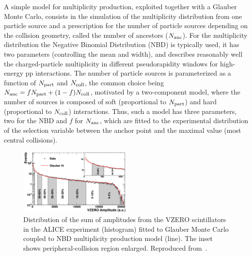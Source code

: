 A simple model for multiplicity production, exploited together with a Glauber Monte Carlo, consists in the simulation of the multiplicity distribution from one particle source and a prescription for the number of particle sources depending on the collision geometry, called the number of ancestors ($N_{\rm anc}$). For the multiplicity distribution the Negative Binomial Distribution (NBD) is typically used, it has two parameters (controlling the mean and width), and describes reasonably well the charged-particle multiplicity in different pseudorapidity windows for high-energy pp interactions. The number of particle sources is parameterized as a function of $N_{\rm part}$ and $N_{\rm coll}$, the common choice being $N_{\rm anc} = f N_{\rm part} + (1 - f) N_{\rm coll}$, motivated by a two-component model, where the number of sources is composed of soft (proportional to $N_{\rm part}$) and hard (proportional to $N_{\rm coll}$) interactions. Thus, such a model has three parameters, two for the NBD and $f$ for $N_{\rm anc}$, which are fitted to the experimental distribution of the selection variable between the anchor point and the maximal value (most central collisions).

\begin{figure}
\centering
\includegraphics[width=0.5\textwidth]{ksfigures/VZEROCent.pdf}
\caption{Distribution of the sum of amplitudes from the VZERO scintillators in the ALICE experiment (histogram) fitted to Glauber Monte Carlo coupled to NBD multiplicity production model (line). The inset shows peripheral-collision region enlarged. Reproduced from~\cite{Abelev:2013qoq}.}
\label{figks:V0centr}
\end{figure}

